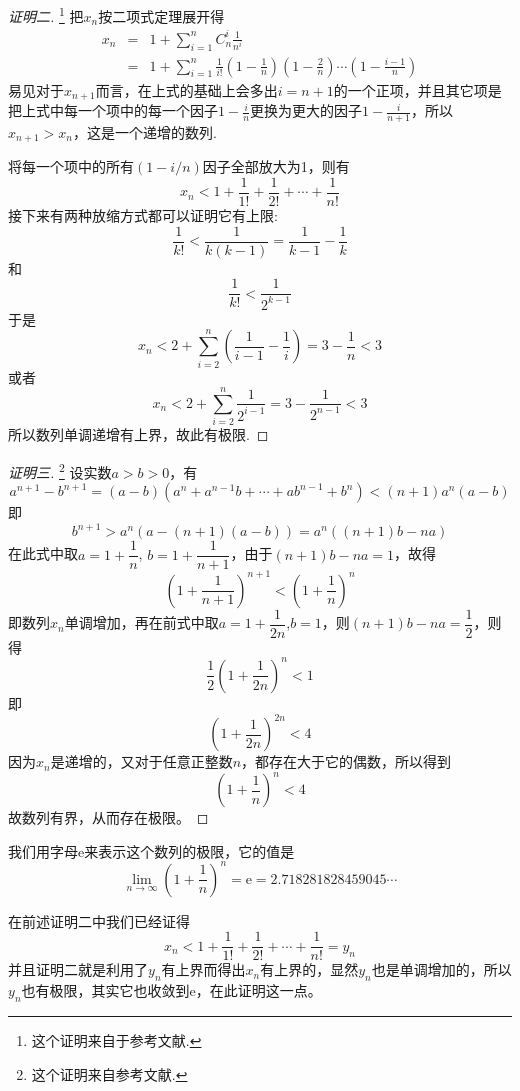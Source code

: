 \begin{proof}[证明二]\footnote{这个证明来自于参考文献\cite{math-analysis}.}
  把$x_n$按二项式定理展开得
  \begin{eqnarray*}
    x_n & = & 1+\sum_{i=1}^n C_n^i \frac{1}{n^i} \\
    & = & 1+ \sum_{i=1}^n \frac{1}{i!}\left( 1-\frac{1}{n} \right) \left( 1-\frac{2}{n} \right)\cdots \left( 1-\frac{i-1}{n} \right)
  \end{eqnarray*}
  易见对于$x_{n+1}$而言，在上式的基础上会多出$i=n+1$的一个正项，并且其它项是把上式中每一个项中的每一个因子$1-\frac{i}{n}$更换为更大的因子$1-\frac{i}{n+1}$，所以$x_{n+1}>x_n$，这是一个递增的数列.

  将每一个项中的所有$(1-i/n)$因子全部放大为1，则有
  \[  x_n < 1+\frac{1}{1!}+\frac{1}{2!}+\cdots+\frac{1}{n!} \]
  接下来有两种放缩方式都可以证明它有上限:
  \[ \frac{1}{k!} < \frac{1}{k(k-1)} = \frac{1}{k-1} - \frac{1}{k} \]
  和
  \[ \frac{1}{k!} < \frac{1}{2^{k-1}} \]
  于是
  \[ x_n < 2 + \sum_{i=2}^n \left( \frac{1}{i-1}-\frac{1}{i} \right) = 3-\frac{1}{n} < 3 \]
  或者
  \[ x_n < 2 + \sum_{i=2}^n \frac{1}{2^{i-1}} = 3-\frac{1}{2^{n-1}} < 3 \]
  所以数列单调递增有上界，故此有极限.
\end{proof}

\begin{proof}[证明三]\footnote{这个证明来自参考文献\cite{math-analysis}.}
  设实数$a>b>0$，有
  \[ a^{n+1}-b^{n+1}=(a-b)(a^n+a^{n-1}b+\cdots+ab^{n-1}+b^n) < (n+1)a^n(a-b) \]
  即
  \begin{equation}
    \label{eq:example-equation-a-n-b-n}
   b^{n+1}>a^n(a-(n+1)(a-b))=a^n((n+1)b-na) 
  \end{equation}
  在此式中取$a=1+\dfrac{1}{n}$, $b=1+\dfrac{1}{n+1}$，由于$(n+1)b-na=1$，故得
  \[ \left( 1+\frac{1}{n+1} \right)^{n+1} < \left( 1+\frac{1}{n} \right)^n \]
  即数列$x_n$单调增加，再在前式中取$a=1+\dfrac{1}{2n}$,$b=1$，则$(n+1)b-na=\dfrac{1}{2}$，则得
  \[ \frac{1}{2} \left( 1 + \frac{1}{2n} \right)^n < 1 \]
  即
  \[ \left( 1 + \frac{1}{2n} \right)^{2n} < 4 \]
  因为$x_n$是递增的，又对于任意正整数$n$，都存在大于它的偶数，所以得到
  \[ \left( 1 + \frac{1}{n} \right)^n < 4 \]
  故数列有界，从而存在极限。
\end{proof}

我们用字母$\mathrm{e}$来表示这个数列的极限，它的值是
\[ \lim_{n \to \infty} \left( 1+\frac{1}{n} \right)^n = \mathrm{e}= 2.718281828459045\cdots \]

在前述证明二中我们已经证得
\[ x_n < 1 + \frac{1}{1!} + \frac{1}{2!} + \cdots + \frac{1}{n!} = y_n \]
并且证明二就是利用了$y_n$有上界而得出$x_n$有上界的，显然$y_n$也是单调增加的，所以$y_n$也有极限，其实它也收敛到$\mathrm{e}$，在此证明这一点。

